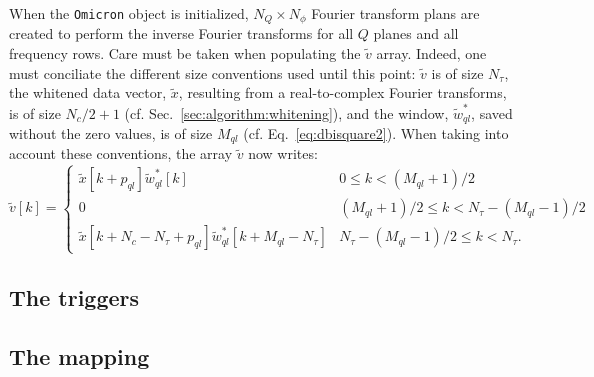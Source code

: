 When the \texttt{Omicron} object is initialized, $N_Q\times N_{\phi}$ Fourier transform plans are created to perform the inverse Fourier transforms for all $Q$ planes and all frequency rows. Care must be taken when populating the $\tilde{v}$ array. Indeed, one must conciliate the different size conventions used until this point: $\tilde{v}$ is of size $N_\tau $, the whitened data vector, $\tilde{x}$, resulting from a real-to-complex Fourier transforms, is of size $N_c/2+1$ (cf. Sec.~\ref{sec:algorithm:whitening}), and the window, $\tilde{w}^*_{ql}$, saved without the zero values, is of size $M_{ql}$ (cf. Eq.~\ref{eq:dbisquare2}). When taking into account these conventions, the array $\tilde{v}$ now writes:
\begin{equation}
  \tilde{v}[k] =
  \begin{cases}
    \tilde{x}[k+p_{ql}]\tilde{w}_{ql}^*[k]                     & 0 \le k < (M_{ql}+1)/2 \\
    0                                                        & (M_{ql}+1)/2 \le k < N_\tau-(M_{ql}-1)/2 \\
    \tilde{x}[k+N_c-N_\tau+p_{ql}]\tilde{w}_{ql}^*[k+M_{ql}-N_\tau] & N_\tau-(M_{ql}-1)/2 \le k < N_\tau.
  \end{cases}
  \label{eq:v2}
\end{equation}



\subsection{The triggers} \label{sec:algorithm:triggering}

\subsection{The mapping} \label{sec:algorithm:mapping}
